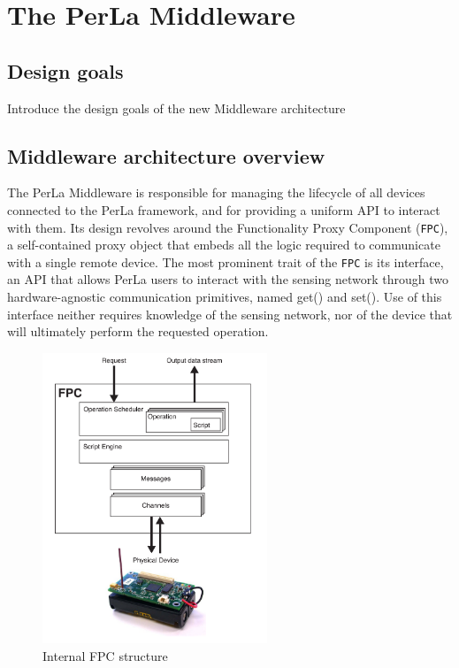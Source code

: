 \chapter{The PerLa Middleware}
\label{cha:middleware_overview}

\section{Design goals}

Introduce the design goals of the new Middleware architecture

\section{Middleware architecture overview}

The PerLa Middleware is responsible for managing the lifecycle of all devices
connected to the PerLa framework, and for providing a uniform API to interact
with them. Its design revolves around the Functionality Proxy Component
(\texttt{FPC}), a self-contained proxy object that embeds all the logic
required to communicate with a single remote device.  The most prominent trait
of the \texttt{FPC} is its interface, an API that allows PerLa users to
interact with the sensing network through two hardware-agnostic communication
primitives, named get() and set(). Use of this interface neither requires
knowledge of the sensing network, nor of the device that will ultimately
perform the requested operation.

\begin{figure}[h!]
\center
\includegraphics[width=0.6\textwidth]{imgs/fpc.pdf}
\caption{Internal FPC structure}
\label{fig:fpc_overview}
\end{figure}

